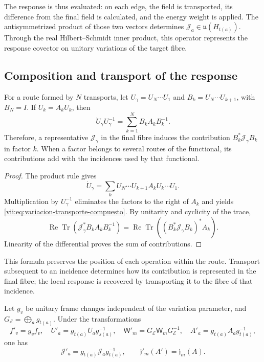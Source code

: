 The response is thus evaluated: on each edge, the field is transported,
its difference from the final field is calculated, and the energy weight is applied.
The antisymmetrized product of those two vectors determines
\(\mathcal J_a\in\mathfrak u(H_{t(a)})\). Through the real
Hilbert--Schmidt inner product, this operator represents the response covector
on unitary variations of the target fibre.

\subsection{Composition and transport of the response}
\label{vii:subsec:composicion-respuesta}

\begin{proposition}
\label{vii:prop:composicion-respuesta}
For a route formed by \(N\) transports, let
\(U_\gamma=U_N\cdots U_1\) and
\(B_k=U_N\cdots U_{k+1}\), with \(B_N=I\).
If \(\dot U_k=A_kU_k\), then
\begin{equation}
 \dot U_\gamma U_\gamma^{-1}
 =\sum_{k=1}^N B_kA_kB_k^{-1}.
 \label{vii:eq:variacion-transporte-compuesto}
\end{equation}
Therefore, a representative \(\mathcal J_\gamma\) in the final fibre
induces the contribution
\(B_k^*\mathcal J_\gamma B_k\) in factor \(k\). When a factor belongs to several
routes of the functional, its contributions add with the incidences
used by that functional.
\end{proposition}

\begin{proof}
The product rule gives
\[
 \dot U_\gamma=\sum_k
 U_N\cdots U_{k+1}A_kU_k\cdots U_1.
\]
Multiplication by \(U_\gamma^{-1}\) eliminates the factors to the right
of \(A_k\) and yields \eqref{vii:eq:variacion-transporte-compuesto}.
By unitarity and cyclicity of the trace,
\[
 \operatorname{Re}\operatorname{Tr}
   (\mathcal J_\gamma^*B_kA_kB_k^{-1})
 =\operatorname{Re}\operatorname{Tr}
   ((B_k^*\mathcal J_\gamma B_k)^*A_k).
\]
Linearity of the differential proves the sum of contributions.
\end{proof}

This formula preserves the position of each operation within the route.
Transport subsequent to an incidence determines how its contribution
is represented in the final fibre; the local response is recovered
by transporting it to the fibre of that incidence.

\begin{proposition}
\label{vii:prop:covariancia-corriente-memoria}
Let \(g_v\) be unitary frame changes independent of the
variation parameter, and \(G_{\mathcal E}=\bigoplus_a g_{t(a)}\).
Under the transformations
\[
 f'_v=g_vf_v,\quad U'_a=g_{t(a)}U_ag_{s(a)}^{-1},\quad
 \mathsf W'_m=G_{\mathcal E}\mathsf W_mG_{\mathcal E}^{-1},\quad
 A'_a=g_{t(a)}A_ag_{t(a)}^{-1},
\]
one has
\begin{equation}
 \mathcal J'_a=g_{t(a)}\mathcal J_ag_{t(a)}^{-1},
 \qquad \mathfrak j'_m(A')=\mathfrak j_m(A).
 \label{vii:eq:covariancia-respuesta}
\end{equation}
\end{proposition}

